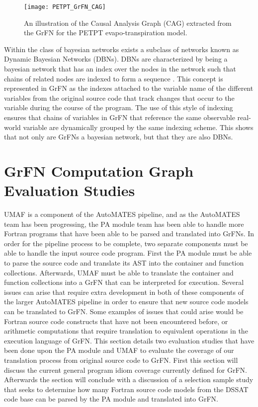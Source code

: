 \begin{figure}[!tbp]
  \label{fig:petpt_cag}
  \centering
  \texttt{[image: PETPT\_GrFN\_CAG]}
  \caption[PETPT GrFN Causal Analysis Graph]{An illustration of the Causal Analysis Graph (CAG) extracted from the GrFN for the PETPT evapo-transpiration model.}
\end{figure}

Within the class of bayesian networks exists a subclass of networks known as Dynamic Bayesian Networks (DBNs).
DBNs are characterized by being a bayesian network that has an index over the nodes in the network such that chains of related nodes are indexed to form a sequence \citep{pearl2009causality}.
This concept is represented in GrFN as the indexes attached to the variable name of the different variables from the original source code that track changes that occur to the variable during the course of the program.
The use of this style of indexing ensures that chains of variables in GrFN that reference the same observable real-world variable are dynamically grouped by the same indexing scheme.
This shows that not only are GrFNs a bayesian network, but that they are also DBNs.

\section{GrFN Computation Graph Evaluation Studies\label{sec:grfn_eval}}
UMAF is a component of the AutoMATES pipeline, and as the AutoMATES team has been progressing, the PA module team has been able to handle more Fortran programs that have been able to be parsed and translated into GrFNs.
In order for the pipeline process to be complete, two separate components must be able to handle the input source code program.
First the PA module must be able to parse the source code and translate its AST into the container and function collections.
Afterwards, UMAF must be able to translate the container and function collections into a GrFN that can be interpreted for execution.
Several issues can arise that require extra development in both of these components of the larger AutoMATES pipeline in order to ensure that new source code models can be translated to GrFN.
Some examples of issues that could arise would be Fortran source code constructs that have not been encountered before, or arithmetic computations that require translation to equivalent operations in the execution language of GrFN.
This section details two evaluation studies that have been done upon the PA module and UMAF to evaluate the coverage of our translation process from original source code to GrFN.
First this section will discuss the current general program idiom coverage currently defined for GrFN.
Afterwards the section will conclude with a discussion of a selection sample study that seeks to determine how many Fortran source code models from the DSSAT code base can be parsed by the PA module and translated into GrFN.

